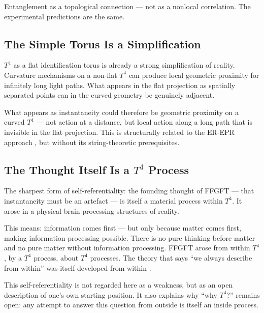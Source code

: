 \begin{keyresult}
Entanglement as a topological connection --- not as a nonlocal correlation. The experimental predictions are the same.
\end{keyresult}

\subsection{The Simple Torus Is a Simplification}

$T^4$ as a flat identification torus is already a strong simplification of reality. Curvature mechanisms on a non-flat $T^4$ can produce local geometric proximity for infinitely long light paths. What appears in the flat projection as spatially separated points can in the curved geometry be genuinely adjacent.

What appears as instantaneity could therefore be geometric proximity on a curved $T^4$ --- not action at a distance, but local action along a long path that is invisible in the flat projection. This is structurally related to the ER-EPR approach \cite{Maldacena2013}, but without its string-theoretic prerequisites.

\subsection{The Thought Itself Is a $T^4$ Process}

The sharpest form of self-referentiality: the founding thought of FFGFT --- that instantaneity must be an artefact --- is itself a material process within $T^4$. It arose in a physical brain processing structures of reality.

This means: information comes first --- but only because matter comes first, making information processing possible. There is no pure thinking before matter and no pure matter without information processing. FFGFT arose from within $T^4$, by a $T^4$ process, about $T^4$ processes. The theory that says ``we always describe from within'' was itself developed from within \cite{Epistemologie2026}.

This self-referentiality is not regarded here as a weakness, but as an open description of one's own starting position. It also explains why ``why $T^4$?'' remains open: any attempt to answer this question from outside is itself an inside process.

